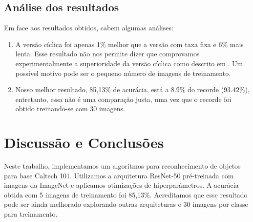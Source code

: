 \documentclass[conference]{IEEEtran}
\begin{document}
\subsection{Análise dos resultados}
Em face aos resultados obtidos, cabem algumas análises:
\begin{enumerate}
    \item A versão cíclica foi apenas 1\% melhor que a versão com taxa fixa e 6\% mais lenta. Esse resultado não nos permite dizer que comprovamos experimentalmente a superioridade da versão cíclica como descrito em \cite{annealing, fastai}. Um possível motivo pode ser o pequeno número de imagens de treinamento.
    \item Nosso melhor resultado, 85,13\% de acurácia, está a 8.9\% do recorde (93.42\%\cite{he}), entretanto, essa não é uma comparação justa, uma vez que o recorde foi obtido treinando-se com 30 imagens.
\end{enumerate}


\section{Discussão e Conclusões}
Neste trabalho, implementamos um algoritmos para reconhecimento de objetos para base Caltech 101. Utilizamos a arquitetura ResNet-50 pré-treinada com imagens da ImageNet e aplicamos otimizações de hiperparâmetros. A acurácia obtida com 5 imagens de treinamento foi 85,13\%. Acreditamos que esse resultado pode ser ainda melhorado explorando outras arquiteturas e 30 imagens por classe para treinamento. 




\end{document}
